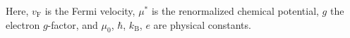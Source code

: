 \documentclass[aps,prb,a4paper,10pt,twocolumn,showpacs,floatfix,superscriptaddress,preprintnumbers,longbibliography]{revtex4-2}
\begin{document}
%
%

\noindent
Here, $v_\mathrm{F}$ is the Fermi velocity, $\mu^{*}$ is the 
renormalized chemical potential, $g$ the electron $g$-factor,  %
and $\mu_{0}$, $\hbar$, $k_\mathrm{B}$, $e$ are physical constants.
\end{document}

